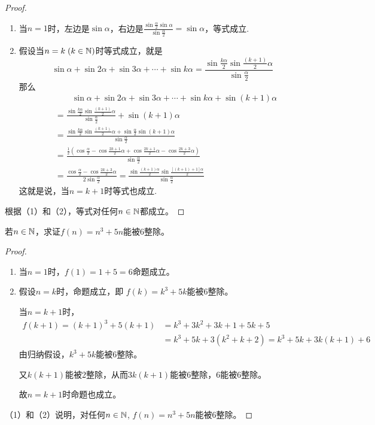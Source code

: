 \begin{proof}
\begin{enumerate}[(1)]
    \item 当$n=1$时，左边是$\sin\alpha$，右边是$\frac{\sin\frac{\alpha}{2}\sin\alpha}{\sin\frac{\alpha}{2}}=\sin\alpha$，等式成立.
    \item 假设当$n=k\; (k\in\mathbb{N})$时等式成立，就是
\[\sin\alpha+\sin2\alpha+\sin3\alpha+\cdots+\sin k\alpha=\frac{\sin\frac{k\alpha}{2}\sin\frac{(k+1)}{2}\alpha}{\sin\frac{\alpha}{2}}\]
那么
\[\begin{split}
 &\qquad    \sin\alpha+\sin2\alpha+\sin3\alpha+\cdots+\sin k\alpha+\sin (k+1)\alpha\\
 &=\frac{\sin\frac{k\alpha}{2}\sin\frac{(k+1)}{2}\alpha}{\sin\frac{\alpha}{2}}+\sin (k+1)\alpha\\
 &=\frac{\sin\frac{k\alpha}{2}\sin\frac{(k+1)}{2}\alpha+\sin\frac{\alpha}{2}\sin (k+1)\alpha}{\sin\frac{\alpha}{2}}\\
 &=\frac{\frac{1}{2}\left(\cos\frac{\alpha}{2}-\cos\frac{2k+1}{2}\alpha+\cos\frac{2k+1}{2}\alpha-\cos\frac{2k+3}{2}\alpha\right)}{\sin\frac{\alpha}{2}}\\
 &=\frac{\cos\frac{\alpha}{2}-\cos\frac{2k+3}{2}\alpha}{2\sin\frac{\alpha}{2}}=\frac{\sin\frac{(k+1)\alpha}{2}\sin\frac{[(k+1)+1]\alpha}{2}}{\sin\frac{\alpha}{2}}
\end{split}\]
这就是说，当$n=k+1$时等式也成立.
\end{enumerate}

根据（1）和（2），等式对任何$n\in \mathbb{N}$都成立。
\end{proof}






\begin{example}
    若$n\in\mathbb{N}$，求证$f(n)=n^3+5n$能被6整除。
\end{example}

\begin{proof}
\begin{enumerate}[(1)]
    \item 当$n=1$时，$f(1)=1+5=6$命题成立。
\item 假设$n=k$时，命题成立，即
$f(k)=k^3+5k$能被6整除。

当$n=k+1$时，
\[\begin{split}
f(k+1)=(k+1)^3+5(k+1)&=k^3+3k^2+3k+1+5k+5\\
&=k^3+5k+3(k^2+k+2)=k^3+5k+3k(k+1)+6    
\end{split}\]
由归纳假设，$k^3+5k$能被6整除。

又$k(k+1)$能被2整除，从而$3k(k+1)$能被6整除，6能被6整除。

故$n=k+1$时命题也成立。
\end{enumerate}
（1）和（2）说明，对任何$n\in\mathbb{N}$, $f(n)=n^3+5n$能被6整除。
\end{proof}

